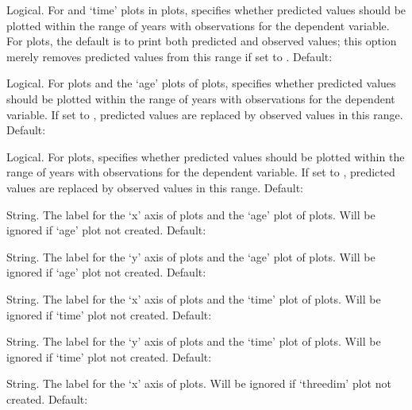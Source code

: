 \begin{Arguments}
\begin{ldescription}
\item[\code{time.insamp.predict}] Logical. For  and `time'
plots in  plots, specifies whether
predicted values should be plotted within the range of years with
observations for the dependent variable. For  plots,
the default is to print both predicted and observed values; this
option merely removes predicted values from this range if set to
. Default: 

\item[\code{age.insamp.predict}] Logical. For  plots and the
`age' plots of  plots, specifies whether
predicted values should be plotted within the range of years with
observations for the dependent variable. If set to
, predicted values are replaced by observed values in
this range.  Default: 

\item[\code{threedim.insamp.predict}] Logical. For  plots,
specifies whether predicted values should be plotted within the
range of years with observations for the dependent variable. If set to
, predicted values are replaced by observed values in
this range.  Default: 

\item[\code{age.xlab}] String. The label for the `x' axis of  plots
and the `age' plot of  plots. Will be ignored
if `age' plot not created. Default: 

\item[\code{age.ylab}] String. The label for the `y' axis of  plots
and the `age' plot of  plots. Will be ignored
if `age' plot not created. Default: 

\item[\code{time.xlab}] String. The label for the `x' axis of 
plots and the `time' plot of  plots. Will be
ignored if `time' plot not created. Default: 

\item[\code{time.ylab}] String. The label for the `y' axis of 
plots and the `time' plot of  plots. Will be
ignored if `time' plot not created. Default: 

\item[\code{threedim.xlab}] String. The label for the `x' axis of
 plots. Will be ignored if `threedim' plot
not created.  Default: 


\end{ldescription}
\end{Arguments}
